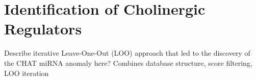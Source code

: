 \section{Identification of Cholinergic Regulators} \label{sec:database:chol-reg}
Describe iterative Leave-One-Out (LOO) approach that led to the discovery of the CHAT miRNA anomaly here? Combines database structure, score filtering, LOO iteration


